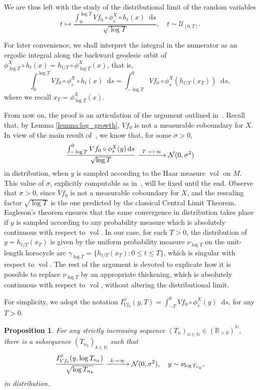 \documentclass[10pt]{amsart}
\newcommand\To[1]{\mathchoice{\xrightarrow{\kern4pt#1\kern3pt}}{\stackrel{#1}{\longrightarrow}}{}{}}
\newcommand \R{\mathbb{R}}
\newcommand \N{\mathbb{N}}
\newcommand {\cN}{\mathcal{N}}
\newcommand*{\diff}{\mathop{}\!\mathrm{d}}
\DeclareMathOperator{\vol}{vol}
\newtheorem {proposition}[theorem]{Proposition}
\theoremstyle{definition}
\begin{document}
\begin{appendix}
We are thus left with the study of the distributional limit of the random variables
\begin{equation*}
t\mapsto \frac{\int_0^{\log{T}}Vf_0\circ \phi^{X}_s\circ h_t(x) \diff s}{\sqrt{\log{T}}}, \quad t\sim \mathcal{U}_{[0,T]}.
\end{equation*}

For later convenience, we shall interpret the integral in the numerator as an ergodic integral along the backward geodesic orbit of $\phi_{\log{T}}^{X}\circ h_t(x)=h_{t/T} \circ \phi^{X}_{\log{T}}(x)$, that is,
\begin{equation*}
\int_0^{\log{T}}Vf_0\circ \phi^{X}_s\circ h_t(x) \diff s=\int_{-\log{T}}^{0}Vf_0\circ \phi_s^{X}(h_{t/T}(x_T))\diff s,
\end{equation*}
where we recall $x_T =\phi^{X}_{\log{T}}(x)$.

From now on, the proof is an articulation of the argument outlined in~\cite{Dolgopyat-Sarig}. Recall that, by Lemma \ref{lemma:log_growth}, $Vf_0$ is not a measurable coboundary for $X$. In view of the main result of~\cite{Rat:CLT}, we know that, for some $\sigma >0$,
\begin{equation*}
\frac{\int_{-\log{T}}^{0}Vf_0\circ \phi^{X}_s(y)\diff s}{\sqrt{\log{T}}}\To{T\to+\infty}\cN(0,\sigma^{2})
\end{equation*}
in distribution, when $y$ is sampled according to the Haar measure $\vol$ on $M$. This value of $\sigma$, explicitly computable as in~\cite[Th.\,3.1]{Rat:CLT}, will be fixed until the end.
Observe that $\sigma >0$, since $Vf_0$ is not a measurable coboundary for $X$, and the rescaling factor $\sqrt{\log T}$ is the one predicted by the classical Central Limit Theorem.
Eagleson's theorem \cite{Eagleson} ensures that the same convergence in distribution takes place if $y$ is sampled according to any probability measure which is absolutely continuous with respect to $\vol$. In our case, for each $T>0$, the distribution of $y=h_{t/T}(x_T)$ is given by the uniform probability measure $\nu_{\log{T}}$ on the unit-length horocycle arc $\gamma_{\log{T}}=\{h_{t/T}(x_T):0\leq t\leq T \}$, which is singular with respect to $\vol$. The rest of the argument is devoted to explicate how it is possible to replace $\nu_{\log{T}}$ by an appropriate thickening, which is absolutely continuous with respect to $\vol$, without altering the distributional limit.

For simplicity, we adopt the notation $I_{Vf_0}^{\phi}(y,T)=\int_{-T}^{0}Vf_0\circ \phi^{X}_s(y)\diff s$, for any $T>0$.
\begin{proposition}
\label{thickeningtrick}
For any strictly increasing sequence $(T_n)_{n\in \N}\in (\R_{>0})^{\N}$, there is a subsequence $(T_{n_k})_{k\in \N}$ such that
\begin{equation*}
\frac{I^{\phi}_{Vf_0}(y,\log{T_{n_k}})}{\sqrt{\log{T_{n_k}}}}\To{k\to\infty}\cN(0,\sigma^{2}), \quad y\sim \nu_{\log{T_{n_k}}},
\end{equation*}
in distribution.
\end{proposition}


\end{appendix}
\end{document}
